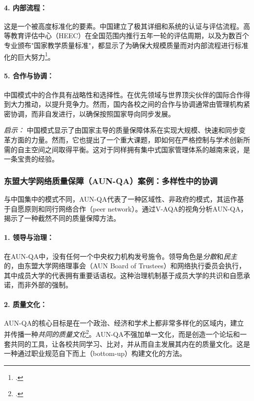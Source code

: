 \paragraph{4. 内部流程：} 这是一个被高度标准化的要素。中国建立了极其详细和系统的认证与评估流程。高等教育评估中心（HEEC）在全国范围内推行五年一轮的评估周期，以及为数百个专业颁布"国家教学质量标准"，都显示了为确保大规模质量而对内部流程进行标准化的巨大努力\footcite{ChinaEQA_HEEC_Standards}。

\paragraph{5. 合作与协调：} 中国模式中的合作具有战略性和选择性。在优先领域与世界顶尖伙伴的国际合作得到大力推动，以提升竞争力。然而，国内各校之间的合作与协调通常由管理机构紧密协调，而非自发进行，以确保按照国家导向同步发展。

\textit{启示：} 中国模式显示了由国家主导的质量保障体系在实现大规模、快速和同步变革方面的力量。然而，它也提出了一个重大课题，即如何在严格控制与学术创新所需的自主空间之间取得平衡。这对于同样拥有集中式国家管理体系的越南来说，是一条宝贵的经验。

\subsubsection{东盟大学网络质量保障（AUN-QA）案例：多样性中的协调}
\label{subsubsec:case_aunqa}
与中国集中的模式不同，AUN-QA代表了一种区域性、非政府的模式，其运作基于自愿原则和同行网络合作（peer network）。通过V-AQA的视角分析AUN-QA，揭示了一种截然不同的质量保障方法。

\paragraph{1. 领导与治理：} 在AUN-QA中，没有任何一个中央权力机构发号施令。领导角色是\textit{分散}和\textit{民主}的，由东盟大学网络理事会（AUN Board of Trustees）和网络执行委员会执行，其中成员大学的代表拥有重要话语权。这种治理机制基于成员大学的共识和自愿承诺，而非外部的强制。

\paragraph{2. 质量文化：} AUN-QA的核心目标是在一个政治、经济和学术上都非常多样化的区域内，建立并传播一种\textit{共同的质量文化}\footcite{AUN-QA_Challenges_VN}。AUN-QA不强加单一文化，而是创造一个论坛和一套共同的工具，让各校共同学习、比对，并从而自主发展其内在的质量文化。这是一种通过职业规范自下而上（bottom-up）构建文化的方法。

